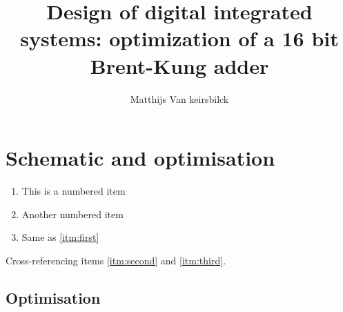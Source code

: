 \documentclass[english]{article}
\begin{document}
\title{Design of digital integrated systems: optimization of a 16 bit Brent-Kung adder}
\author{Matthijs Van keirsbilck}

\maketitle

\section{Schematic and optimisation}

\begin{enumerate}
    \item \label{itm:first} This is a numbered item
    \item Another numbered item \label{itm:second}
    \item \label{itm:third} Same as \ref{itm:first}
\end{enumerate}
Cross-referencing items \ref{itm:second} and \ref{itm:third}.


\subsection{Optimisation}
\end{document}
